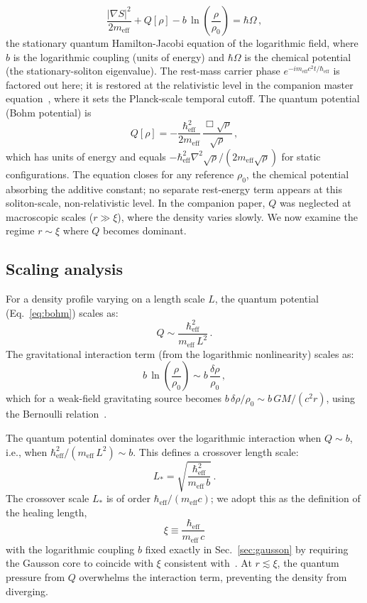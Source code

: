 \documentclass[12pt, a4paper]{article}
\newcommand{\meff}{m_{\mathrm{eff}}}
\newcommand{\heff}{\hbar_{\mathrm{eff}}}
\begin{document}
\begin{equation}
    \frac{|\nabla S|^2}{2\meff} + Q[\rho]
    - b\,\ln\!\left(\frac{\rho}{\rho_0}\right) = \hbar\Omega\,,
\label{eq:hj}
\end{equation}
the stationary quantum Hamilton-Jacobi equation of the logarithmic field, where $b$ is the logarithmic coupling (units of energy) and $\hbar\Omega$ is the chemical potential (the stationary-soliton eigenvalue). The rest-mass carrier phase $e^{-i\meff c^2 t/\heff}$ is factored out here; it is restored at the relativistic level in the companion master equation~\cite{kulangiev_2026a}, where it sets the Planck-scale temporal cutoff. The quantum potential (Bohm potential) is
\begin{equation}
    Q[\rho] = -\frac{\heff^2}{2\meff}\,\frac{\Box\sqrt{\rho}}{\sqrt{\rho}}\,,
\label{eq:bohm}
\end{equation}
which has units of energy and equals $-\heff^2\nabla^2\sqrt{\rho}/(2\meff\sqrt{\rho})$ for static configurations. The equation closes for any reference $\rho_0$, the chemical potential absorbing the additive constant; no separate rest-energy term appears at this soliton-scale, non-relativistic level. In the companion paper, $Q$ was neglected at macroscopic scales ($r \gg \xi$), where the density varies slowly. We now examine the regime $r \sim \xi$ where $Q$ becomes dominant.

\subsection{Scaling analysis}

For a density profile varying on a length scale $L$, the quantum potential (Eq.~\ref{eq:bohm}) scales as:
\begin{equation}
    Q \sim \frac{\heff^2}{\meff\,L^2}\,.
\label{eq:Q_scaling}
\end{equation}
The gravitational interaction term (from the logarithmic nonlinearity) scales as:
\begin{equation}
    b\,\ln\!\left(\frac{\rho}{\rho_0}\right)
    \sim b\,\frac{\delta\rho}{\rho_0}\,,
\label{eq:grav_scaling}
\end{equation}
which for a weak-field gravitating source becomes $b\,\delta\rho/\rho_0 \sim b\,GM/(c^2 r)$, using the Bernoulli relation~\cite{kulangiev_2026a}.

The quantum potential dominates over the logarithmic interaction when $Q \sim b$, i.e., when $\heff^2/(\meff\,L^2) \sim b$. This defines a crossover length scale:
\begin{equation}
    L_* = \sqrt{\frac{\heff^2}{\meff\,b}}\,.
\end{equation}
The crossover scale $L_*$ is of order $\heff/(\meff c)$; we adopt this as the definition of the healing length,
\begin{equation}
    \boxed{\;\xi \equiv \frac{\heff}{\meff\,c}\;}
\label{eq:healing}
\end{equation}
with the logarithmic coupling $b$ fixed exactly in Sec.~\ref{sec:gausson} by requiring the Gausson core to coincide with $\xi$ consistent with~\cite{kulangiev_2026a}. At $r \lesssim \xi$, the quantum pressure from $Q$ overwhelms the interaction term, preventing the density from diverging.
\end{document}
